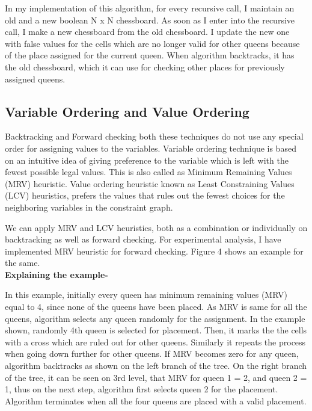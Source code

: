 \documentclass[conference]{IEEEtran}
\begin{document}
In my implementation of this algorithm, for every recursive call, I maintain an old and a new boolean N x N chessboard. As soon as I enter into the recursive call, I make a new chessboard from the old chessboard. I update the new one with false values for the cells which are no longer valid for other queens because of the place assigned for the current queen. When algorithm backtracks, it has the old chessboard, which it can use for checking other places for previously assigned queens.

\subsection{Variable Ordering and Value Ordering}

Backtracking and Forward checking both these techniques do not use any special order for assigning values to the variables. Variable ordering technique is based on an intuitive idea of giving preference to the variable which is left with the fewest possible legal values. This is also called as Minimum Remaining Values (MRV) heuristic. Value ordering heuristic known as Least Constraining Values (LCV) heuristics,  prefers the values that rules out the fewest choices for the neighboring variables in the constraint graph.

We can apply MRV and LCV heuristics, both as a combination or individually on backtracking as well as forward checking. For experimental analysis, I have implemented MRV heuristic for forward checking. Figure  4 shows an example for the same. \\

\textbf {Explaining the example- }

In this example, initially every queen has minimum remaining values (MRV) equal to 4, since none of the queens have been placed. As MRV is same for all the queens, algorithm selects any queen randomly for the assignment. In the example shown, randomly 4th queen is selected for placement. Then, it marks the the cells with a cross which are ruled out for other queens. Similarly it repeats the process when going down further for other queens. If MRV becomes zero for any queen, algorithm backtracks as shown on the left branch of the tree. On the right branch of the tree, it can be seen on 3rd level, that MRV for queen 1 = 2, and queen 2 = 1, thus on the next step, algorithm first selects queen 2 for the placement.
\\Algorithm terminates when all the four queens are placed with a valid placement. 
\end{document}
